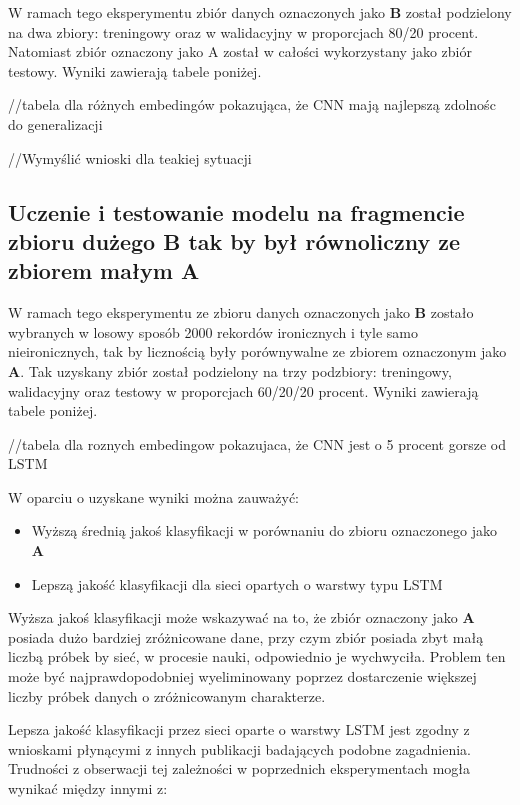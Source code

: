 W ramach tego eksperymentu zbiór danych oznaczonych jako \textbf{B} został podzielony na dwa zbiory: treningowy oraz w walidacyjny w proporcjach 80/20 procent. Natomiast zbiór oznaczony jako A został w całości wykorzystany jako zbiór testowy. Wyniki zawierają tabele poniżej. 

//tabela dla różnych embedingów pokazująca, że CNN mają najlepszą zdolnośc do generalizacji 

//Wymyślić wnioski dla teakiej sytuacji 


\subsection{Uczenie i testowanie modelu na fragmencie zbioru dużego B tak by był równoliczny ze zbiorem małym A}

W ramach tego eksperymentu ze zbioru danych oznaczonych jako \textbf{B} zostało wybranych w losowy sposób 2000 rekordów ironicznych i tyle samo nieironicznych, tak by licznością były porównywalne ze zbiorem oznaczonym jako \textbf{A}. Tak uzyskany zbiór został podzielony na trzy podzbiory: treningowy, walidacyjny oraz testowy w proporcjach 60/20/20 procent. Wyniki zawierają tabele poniżej. 

//tabela dla roznych embedingow pokazujaca, że CNN jest o 5 procent gorsze od LSTM 

W oparciu o uzyskane wyniki można zauważyć: 

\begin{itemize}
    \item Wyższą średnią jakoś klasyfikacji w porównaniu do zbioru oznaczonego jako \textbf{A}
    \item Lepszą jakość klasyfikacji dla sieci opartych o warstwy typu LSTM
\end{itemize}
 

Wyższa jakoś klasyfikacji może wskazywać na to, że zbiór oznaczony jako \textbf{A} posiada dużo bardziej zróżnicowane dane, przy czym zbiór posiada zbyt małą liczbą próbek by sieć, w procesie nauki, odpowiednio je wychwyciła. Problem ten może być najprawdopodobniej wyeliminowany poprzez dostarczenie większej liczby próbek danych o zróżnicowanym charakterze. 

Lepsza jakość klasyfikacji przez sieci oparte o warstwy LSTM jest zgodny z wnioskami płynącymi z innych publikacji badających podobne zagadnienia. Trudności z obserwacji tej zależności w poprzednich eksperymentach mogła wynikać między innymi z: 


